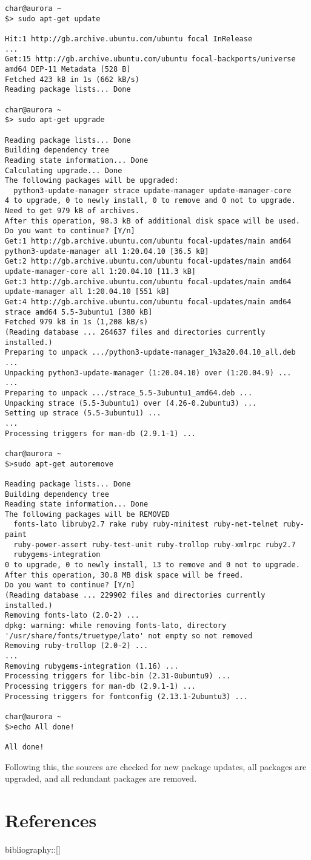 \documentclass[11pt]{amsart}
\begin{document}
\begin{verbatim}
char@aurora ~
$> sudo apt-get update

Hit:1 http://gb.archive.ubuntu.com/ubuntu focal InRelease
...
Get:15 http://gb.archive.ubuntu.com/ubuntu focal-backports/universe amd64 DEP-11 Metadata [528 B]
Fetched 423 kB in 1s (662 kB/s)
Reading package lists... Done

char@aurora ~
$> sudo apt-get upgrade

Reading package lists... Done
Building dependency tree
Reading state information... Done
Calculating upgrade... Done
The following packages will be upgraded:
  python3-update-manager strace update-manager update-manager-core
4 to upgrade, 0 to newly install, 0 to remove and 0 not to upgrade.
Need to get 979 kB of archives.
After this operation, 98.3 kB of additional disk space will be used.
Do you want to continue? [Y/n]
Get:1 http://gb.archive.ubuntu.com/ubuntu focal-updates/main amd64 python3-update-manager all 1:20.04.10 [36.5 kB]
Get:2 http://gb.archive.ubuntu.com/ubuntu focal-updates/main amd64 update-manager-core all 1:20.04.10 [11.3 kB]
Get:3 http://gb.archive.ubuntu.com/ubuntu focal-updates/main amd64 update-manager all 1:20.04.10 [551 kB]
Get:4 http://gb.archive.ubuntu.com/ubuntu focal-updates/main amd64 strace amd64 5.5-3ubuntu1 [380 kB]
Fetched 979 kB in 1s (1,208 kB/s)
(Reading database ... 264637 files and directories currently installed.)
Preparing to unpack .../python3-update-manager_1%3a20.04.10_all.deb ...
Unpacking python3-update-manager (1:20.04.10) over (1:20.04.9) ...
...
Preparing to unpack .../strace_5.5-3ubuntu1_amd64.deb ...
Unpacking strace (5.5-3ubuntu1) over (4.26-0.2ubuntu3) ...
Setting up strace (5.5-3ubuntu1) ...
...
Processing triggers for man-db (2.9.1-1) ...

char@aurora ~
$>sudo apt-get autoremove

Reading package lists... Done
Building dependency tree
Reading state information... Done
The following packages will be REMOVED
  fonts-lato libruby2.7 rake ruby ruby-minitest ruby-net-telnet ruby-paint
  ruby-power-assert ruby-test-unit ruby-trollop ruby-xmlrpc ruby2.7
  rubygems-integration
0 to upgrade, 0 to newly install, 13 to remove and 0 not to upgrade.
After this operation, 30.8 MB disk space will be freed.
Do you want to continue? [Y/n]
(Reading database ... 229902 files and directories currently installed.)
Removing fonts-lato (2.0-2) ...
dpkg: warning: while removing fonts-lato, directory '/usr/share/fonts/truetype/lato' not empty so not removed
Removing ruby-trollop (2.0-2) ...
...
Removing rubygems-integration (1.16) ...
Processing triggers for libc-bin (2.31-0ubuntu9) ...
Processing triggers for man-db (2.9.1-1) ...
Processing triggers for fontconfig (2.13.1-2ubuntu3) ...

char@aurora ~
$>echo All done!

All done!
\end{verbatim}

Following this, the sources are checked for new package updates, all packages are upgraded, and all redundant packages are removed.


\hypertarget{x-references}{\section*{References}}
bibliography::[]
\end{document}
